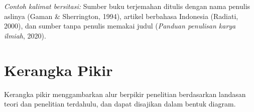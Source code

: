 \textit{Contoh kalimat bersitasi:} Sumber buku terjemahan ditulis dengan nama penulis aslinya (Gaman \& Sherrington, 1994), artikel berbahasa Indonesia (Radiati, 2000), dan sumber tanpa penulis memakai judul (\textit{Panduan penulisan karya ilmiah}, 2020).

\section{Kerangka Pikir}
Kerangka pikir menggambarkan alur berpikir penelitian berdasarkan landasan teori dan penelitian terdahulu, dan dapat disajikan dalam bentuk diagram.

